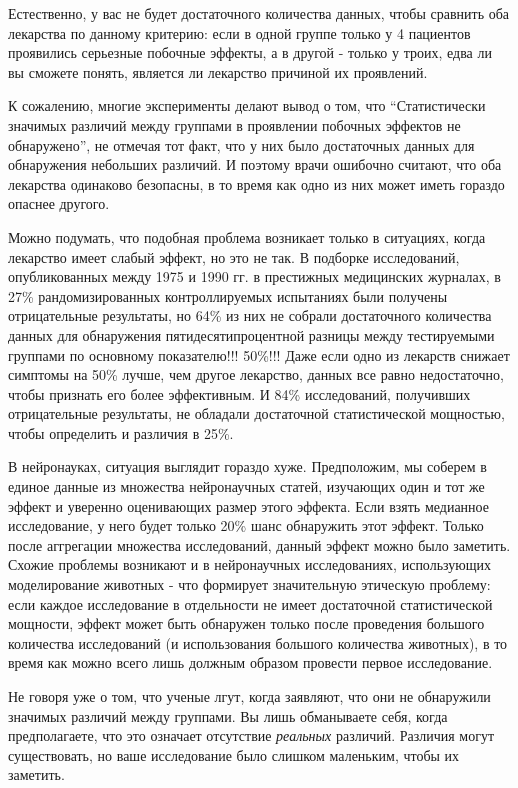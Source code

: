 Естественно, у вас не будет достаточного количества данных, чтобы сравнить оба лекарства по данному критерию: если в одной группе только у 4 пациентов проявились серьезные побочные эффекты, а в другой - только у троих, едва ли вы сможете понять, является ли лекарство причиной их проявлений.


К сожалению, многие эксперименты делают вывод о том, что ``Статистически значимых различий между группами в проявлении побочных эффектов не обнаружено'', не отмечая тот факт, что у них было достаточных данных для обнаружения небольших различий.\cite{tsang_inadequate_2009} И поэтому врачи ошибочно считают, что оба лекарства одинаково безопасны, в то время как одно из них может иметь гораздо опаснее другого.

Можно подумать, что подобная проблема возникает только в ситуациях, когда лекарство имеет слабый эффект, но это не так. В подборке исследований, опубликованных между 1975 и 1990 гг. в престижных медицинских журналах, в 27\% рандомизированных контроллируемых испытаниях были получены отрицательные результаты, но 64\% из них не собрали достаточного количества данных для обнаружения пятидесятипроцентной разницы между тестируемыми группами по основному показателю!!! 50\%!!! Даже если одно из лекарств снижает симптомы на 50\% лучше, чем другое лекарство, данных все равно недостаточно, чтобы признать его более эффективным. И 84\% исследований, получивших отрицательные результаты, не обладали достаточной статистической мощностью, чтобы определить и различия в 25\%.\cite{moher_statistical_1994,bedard_statistical_2007,brown_1987,chung_1998}

В нейронауках, ситуация выглядит гораздо хуже. Предположим, мы соберем в единое данные из множества нейронаучных статей, изучающих один и тот же эффект и уверенно оценивающих размер этого эффекта. Если взять медианное исследование, у него будет только 20\% шанс обнаружить этот эффект. Только после аггрегации множества исследований, данный эффект можно было заметить. Схожие проблемы возникают и в нейронаучных исследованиях, использующих моделирование животных - что формирует значительную этическую проблему: если каждое исследование в отдельности не имеет достаточной статистической мощности, эффект может быть обнаружен только после проведения большого количества исследований (и использования большого количества животных), в то время как можно всего лишь должным образом провести первое исследование.\cite{button_power_2013}

Не говоря уже о том, что ученые лгут, когда заявляют, что они не обнаружили значимых различий между группами. Вы лишь обманываете себя, когда предполагаете, что это означает отсутствие \emph{реальных} различий. Различия могут существовать, но ваше исследование было слишком маленьким, чтобы их заметить.

